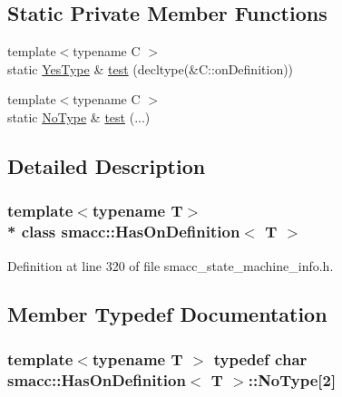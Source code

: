 \subsection*{Static Private Member Functions}
\begin{DoxyCompactItemize}
\item 
{\footnotesize template$<$typename C $>$ }\\static \hyperlink{classsmacc_1_1HasOnDefinition_af147416543b9d5a19d3dfc4f3f0d42a6}{Yes\+Type} \& \hyperlink{classsmacc_1_1HasOnDefinition_ab3431b8ab4f2d559df5bee2c06e75d39}{test} (decltype(\&C\+::on\+Definition))
\item 
{\footnotesize template$<$typename C $>$ }\\static \hyperlink{classsmacc_1_1HasOnDefinition_ab424fbc32a091d6271cabe47eb0725ca}{No\+Type} \& \hyperlink{classsmacc_1_1HasOnDefinition_a1cd0d70f99ffb2ac329a72e61815d5e4}{test} (...)
\end{DoxyCompactItemize}


\subsection{Detailed Description}
\subsubsection*{template$<$typename T$>$\\*
class smacc\+::\+Has\+On\+Definition$<$ T $>$}



Definition at line 320 of file smacc\+\_\+state\+\_\+machine\+\_\+info.\+h.



\subsection{Member Typedef Documentation}
\subsubsection[{\texorpdfstring{No\+Type}{NoType}}]{\setlength{\rightskip}{0pt plus 5cm}template$<$typename T $>$ typedef char {\bf smacc\+::\+Has\+On\+Definition}$<$ T $>$\+::No\+Type\mbox{[}2\mbox{]}\hspace{0.3cm}{\ttfamily [private]}}\hypertarget{classsmacc_1_1HasOnDefinition_ab424fbc32a091d6271cabe47eb0725ca}{}\label{classsmacc_1_1HasOnDefinition_ab424fbc32a091d6271cabe47eb0725ca}


